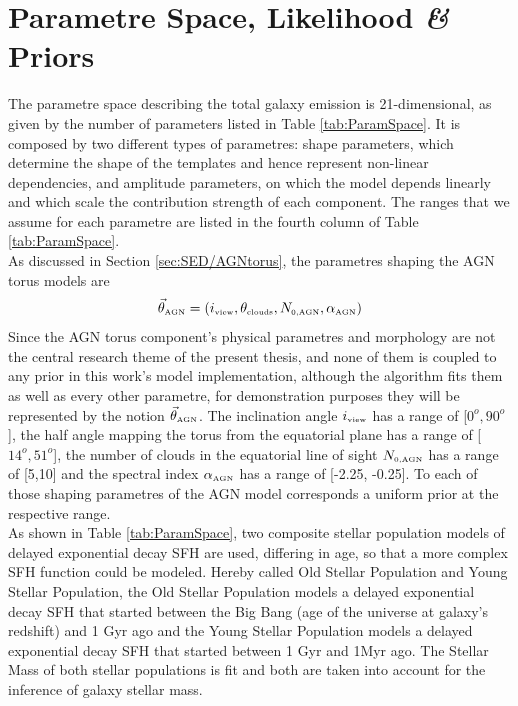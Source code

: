 \section{Parametre Space, Likelihood \textit{\&} Priors}
The parametre space describing the total galaxy emission is 21-dimensional, as given by the number of parameters listed in Table \ref{tab:ParamSpace}. It is composed by two different types of parametres: shape parameters, which determine the shape of the templates and hence represent non-linear dependencies, and amplitude parameters, on which the model depends linearly and which scale the contribution strength of each component. The ranges that we assume for each parametre are listed in the fourth column of Table \ref{tab:ParamSpace}. \\
As discussed in Section \ref{sec:SED/AGNtorus}, the parametres shaping the AGN torus models are
\begin{equation}
    \vec{\theta}_{\mbox{\tiny{AGN}}} = (i_{\mbox{\tiny{view}}}, \theta_{\mbox{\tiny{clouds}}} , N_{\mbox{\tiny{0,AGN}}}, \alpha_{\mbox{\tiny{AGN}}} )
\end{equation}
Since the AGN torus component's physical parametres and morphology are not the central research theme of the present thesis, and none of them is coupled to any prior in this work's model implementation, although the algorithm fits them as well as every other parametre, for demonstration purposes they will be represented by the notion  $\vec{\theta}_{\mbox{\tiny{AGN}}}$.
The inclination angle $i_{\mbox{\tiny{view}}}$ has a range of [$0^o, 90^o$], the half angle mapping the torus from the equatorial plane has a range of [$14^o, 51^o$], the number of clouds in the equatorial line of sight $N_{\mbox{\tiny{0,AGN}}}$ has a range of [5,10] and the spectral index $ \alpha_{\mbox{\tiny{AGN}}}$ has a range of [-2.25, -0.25]. To each of those shaping parametres of the AGN model corresponds a uniform prior at the respective range. \\
As shown in Table \ref{tab:ParamSpace}, two composite stellar population models of delayed exponential decay SFH are used, differing in age, so that a more complex SFH function could be modeled. Hereby called Old Stellar Population and Young Stellar Population, the Old Stellar Population models a delayed exponential decay SFH that started between the Big Bang (age of the universe at galaxy's redshift) and 1 Gyr ago and the Young Stellar Population models a delayed exponential decay SFH that started between 1 Gyr and 1Myr ago. The Stellar Mass of both stellar populations is fit and both are taken into account for the inference of galaxy stellar mass. 

